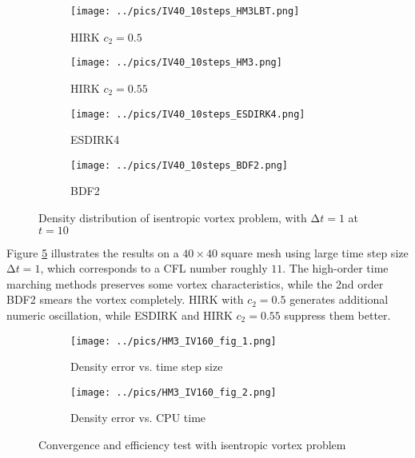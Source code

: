 \documentclass[10pt]{article}
\newcommand{\inc}{\mathrm\Delta}
\begin{document}
\begin{figure}[htbp]
  \centering
  \begin{subfigure}{0.25\textwidth}
    \texttt{[image: ../pics/IV40\_10steps\_HM3LBT.png]}
    \caption[]{HIRK $c_2=0.5$}
    \label{sfig:IV10Step_HM3LBT}
  \end{subfigure}\hfill
  \begin{subfigure}{0.25\textwidth}
    \texttt{[image: ../pics/IV40\_10steps\_HM3.png]}
    \caption[]{HIRK $c_2=0.55$}
    \label{sfig:IV10Step_HM3}
  \end{subfigure}\hfill %
  \begin{subfigure}{0.25\textwidth}
    \texttt{[image: ../pics/IV40\_10steps\_ESDIRK4.png]}
    \caption[]{ESDIRK4}
    \label{sfig:IV10Step_ESDIRK4}
  \end{subfigure}\hfill
  \begin{subfigure}{0.25\textwidth}
    \texttt{[image: ../pics/IV40\_10steps\_BDF2.png]}
    \caption[]{BDF2}
    \label{sfig:IV10Step_BDF2}
  \end{subfigure}
  \caption{Density distribution of isentropic vortex problem, with $\inc t = 1$ at $t=10$}
  \label{fig:IV10Step}
\end{figure}

Figure \ref{fig:IV10Step} illustrates the results on a $40\times40$ square mesh using
large time step size $\inc t = 1$, which corresponds to a CFL number roughly $11$.
The high-order time marching methods preserves some vortex characteristics, while
the 2nd order BDF2 smears the vortex completely. HIRK with $c_2 = 0.5$ generates
additional numeric oscillation, while ESDIRK and HIRK $c_2 = 0.55$ suppress them
better.


\begin{figure}[htbp]
  \centering
  \begin{subfigure}{0.4\textwidth}
    \texttt{[image: ../pics/HM3\_IV160\_fig\_1.png]}
    \caption[]{Density error vs. time step size }
    \label{sfig:IVTests_Conv}
  \end{subfigure}\hfill
  \begin{subfigure}{0.4\textwidth}
    \texttt{[image: ../pics/HM3\_IV160\_fig\_2.png]}
    \caption[]{Density error vs. CPU time}
    \label{sfig:IVTests_Eff}
  \end{subfigure}
  \caption[]{Convergence and efficiency test with isentropic vortex problem}
  \label{fig:IVTests}
\end{figure}
\end{document}
